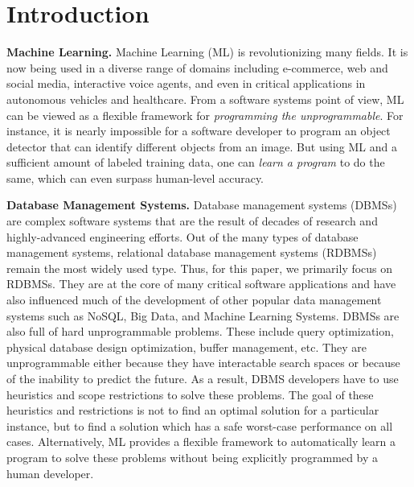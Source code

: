 \section{Introduction}

\vspace{2mm}
\noindent \textbf{Machine Learning.} Machine Learning (ML) is revolutionizing many fields.
It is now being used in a diverse range of domains including e-commerce, web and social media, interactive voice agents, and even in critical applications in autonomous vehicles and healthcare.
From a software systems point of view, ML can be viewed as a flexible framework for \textit{programming the unprogrammable}.
For instance, it is nearly impossible for a software developer to program an object detector that can identify different objects from an image.
But using ML and a sufficient amount of labeled training data, one can \textit{learn a program} to do the same, which can even surpass human-level accuracy.

\vspace{2mm}
\noindent \textbf{Database Management Systems.} Database management systems (DBMSs) are complex software systems that are the result of decades of research and highly-advanced engineering efforts.
Out of the many types of database management systems, relational database management systems (RDBMSs) remain the most widely used type.
Thus, for this paper, we primarily focus on RDBMSs.
They are at the core of many critical software applications and have also influenced much of the development of other popular data management systems such as NoSQL, Big Data, and Machine Learning Systems.
DBMSs are also full of hard unprogrammable problems.
These include query optimization, physical database design optimization, buffer management, etc.
They are unprogrammable either because they have interactable search spaces or because of the inability to predict the future.
As a result, DBMS developers have to use heuristics and scope restrictions to solve these problems.
The goal of these heuristics and restrictions is not to find an optimal solution for a particular instance, but to find a solution which has a safe worst-case performance on all cases.
Alternatively, ML provides a flexible framework to automatically learn a program to solve these problems without being explicitly programmed by a human developer.

